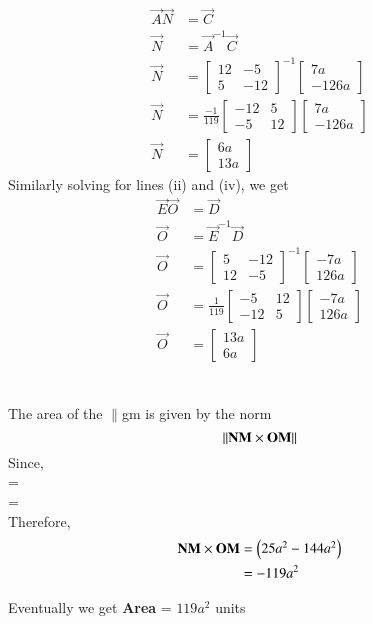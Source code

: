 \documentclass[journal,12pt,twocolumn]{IEEEtran}
\begin{document}
\begin{align*}
\vec{A}\vec{N} &=\vec{C} \\
\vec{N} &= \vec{A}^{-1}\vec{C} \\
\vec{N}
& =
\begin{bmatrix}
12 & -5 \\
5 & -12 
\end{bmatrix}^{-1}
\begin{bmatrix}
7a \\ -126a
\end{bmatrix}  \\[6pt]
\vec{N}
& =
\frac{-1}{119}
\begin{bmatrix}
-12 & 5 \\
-5 & 12 
\end{bmatrix}
\begin{bmatrix}
7a \\ -126a
\end{bmatrix} \\[6pt]
\vec{N}
&=
\begin{bmatrix}
6a \\ 13a
\end{bmatrix}
\end{align*}
Similarly solving for lines (ii) and (iv), we get
\begin{align*}
\vec{E}\vec{O} &=\vec{D} \\
\vec{O} &= \vec{E}^{-1}\vec{D} \\
\vec{O}
& =
\begin{bmatrix}
5 & -12 \\
12 & -5 
\end{bmatrix}^{-1}
\begin{bmatrix}
-7a \\ 126a
\end{bmatrix}  \\[6pt]
\vec{O}
& =
\frac{1}{119}
\begin{bmatrix}
-5 & 12 \\
-12 & 5 
\end{bmatrix}
\begin{bmatrix}
-7a \\ 126a
\end{bmatrix} \\[6pt]
\vec{O}
&=
\begin{bmatrix}
13a \\ 6a
\end{bmatrix}
\end{align*}\\ \\
The area of the $\parallel$gm is given by the norm $$\lVert\mathbf{NM}\times\mathbf{OM}\rVert $$
Since, \\
 = \\
 = \\
Therefore, \\
\begin{align*}
\mathbf{NM}\times\mathbf{OM}&=\begin{pmatrix}25a^2 - 144a^2\end{pmatrix}\\
&={-119a^2}
\end{align*}

Eventually we get \textbf{Area} = $119a^2$ units
\end{document}
